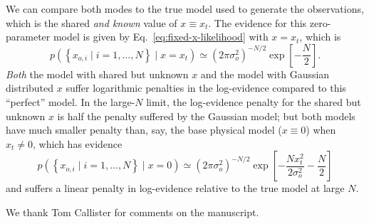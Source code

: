 \documentclass[modern]{aastex631}
\begin{document}
We can compare both modes to the true model used to generate the observations, which is the shared \emph{and known} value of $x \equiv x_t$.  The evidence for this zero-parameter model is given by Eq.\ \eqref{eq:fixed-x-likelihood} with $x = x_t$, which is 
\begin{equation}
    p\left(  \left\{ x_{o,i} \mid i = 1, \ldots, N \right\} \mid x = x_t \right) \simeq \left( 2 \pi \sigma_o^2 \right)^{-N/2} \exp\left[ - \frac{N}{2} \right].
\end{equation}
\emph{Both} the model with shared but unknown $x$ and the model with Gaussian
distributed $x$ suffer logarithmic penalties in the log-evidence compared to
this ``perfect'' model.  In the large-$N$ limit, the log-evidence penalty for
the shared but unknown $x$ is half the penalty suffered by the Gaussian model;
but both models have much smaller penalty than, say, the base physical model ($x
\equiv 0$) when $x_t \neq 0$, which has evidence 
\begin{equation}
    p\left(  \left\{ x_{o,i} \mid i = 1, \ldots, N \right\} \mid x = 0 \right) \simeq \left( 2 \pi \sigma_o^2 \right)^{-N/2} \exp\left[ - \frac{N x_t^2}{2 \sigma_o^2} - \frac{N}{2} \right]
\end{equation}
and suffers a linear penalty in log-evidence relative to the true model at large
$N$.

\begin{acknowledgments}
    We thank Tom Callister for comments on the manuscript.
\end{acknowledgments}


\end{document}
